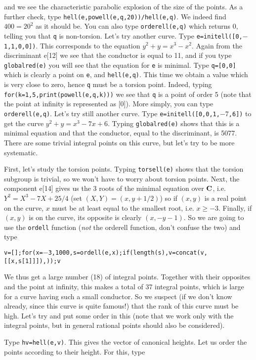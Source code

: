 and we see the
characteristic parabolic explosion of the size of the points. As a further
check, type {\tt hell(e,powell(e,q,20))/hell(e,q)}. We indeed find $400=20^2$
as it should be. You can also type {\tt orderell(e,q)} which returns 0,
telling you that {\tt q} is non-torsion.
\smallskip
Let's try another curve. Type {\tt e=initell([0,$-$1,1,0,0])}. This corresponds
to the equation $y^2+y=x^3-x^2$. Again from the discriminant e[12] we see that
the conductor is equal to 11, and if you type {\tt globalred(e)} you will see
that the equation  for {\tt e} is minimal. Type {\tt q=[0,0]} which is clearly
a point on {\tt e}, and {\tt hell(e,q)}. This time we obtain a value which is
very close to zero, hence {\tt q} must be a torsion point. Indeed, typing
{\tt for(k=1,5,print(powell(e,q,k)))} we see that {\tt q} is a point of order
5 (note that the point at infinity is represented as [0]). More simply,
you can type {\tt orderell(e,q)}.
\smallskip
Let's try still another curve. Type {\tt e=initell([0,0,1,$-7$,6])} to get
the curve $y^2+y=x^3-7x+6$. Typing {\tt globalred(e)} shows that this is a
minimal equation and that the conductor, equal to the discriminant, is 5077.
There are some trivial integral points on this curve, but let's try to be
more systematic. 

First, let's study the torsion points. Typing {\tt torsell(e)} shows that
the torsion subgroup is trivial, so we won't have to worry about torsion
points. Next, the component e[14] gives us the 3 roots of the minimal
equation over $\Bbb C$, i.e. $Y^2=X^3-7X+25/4$ (set $(X,Y)=(x,y+1/2)$)
so if $(x,y)$ is a real point on the curve, $x$ must be at least equal to the 
smallest root, i.e. $x\ge-3$. Finally, if $(x,y)$ is on the curve, its
opposite is clearly $(x,-y-1)$. So we are going to use the {\tt ordell} 
function ({\it not} the orderell function, don't confuse the two) and type

\centerline{\tt v=[];for(x=$-$3,1000,s=ordell(e,x);if(length(s),v=concat(v,[[x,s[1]]]),));v}

We thus get a large number (18) of integral points. Together with their 
opposites and the point at infinity, this makes a total of 37 integral points,
which is large for a curve having such a small conductor. So we suspect
(if we don't know already, since this curve is quite famous!) that the rank
of this curve must be high. Let's try and put some order in this (note that
we work only with the integral points, but in general rational points should
also be considered).

Type {\tt hv=hell(e,v)}. This gives the vector of canonical heights. Let us 
order the points according to their height. For this, type 


